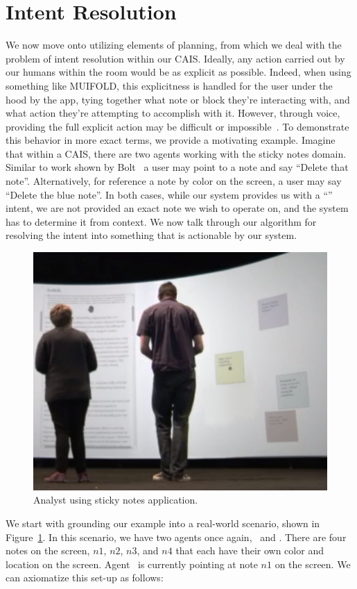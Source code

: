 \section{Intent Resolution}

We now move onto utilizing elements of planning, from which we deal with
the problem of intent resolution within our CAIS.
Ideally, any action carried out by our humans within the room would be as explicit
as possible. Indeed, when using something like MUIFOLD, this explicitness is handled for
the user under the hood by the app, tying together what note or block they're interacting
with, and what action they're attempting to accomplish with it. However, through voice,
providing the full explicit action may be difficult or
impossible~\cite{kephart_embodied_2019}. To demonstrate this
behavior in more exact terms, we provide a motivating example. Imagine that within a CAIS, there
are two agents working with the sticky notes domain. Similar to work shown by
Bolt~\cite{bolt_put-that-there:_1980} a user may point to a note and say ``Delete that
note''. Alternatively, for reference a note by color on the screen, a user may say ``Delete the blue
note''. In both cases, while our system provides us with a ``\delete'' intent, we are not
provided an exact note we wish to operate on, and the system has to determine it from
context. We now talk through our algorithm for resolving the intent into something that
is actionable by our system.

\begin{figure}
\centering
  \includegraphics[width=0.7\columnwidth]{chapters/06_planning/figures/intent_sticky_notes.png}
  \caption{Analyst using sticky notes application.}
  \label{fig:intent_sticky_notes}
\end{figure}

We start with grounding our example into a real-world scenario, shown in
Figure~\ref{fig:intent_sticky_notes}. In this scenario, we have two agents once again, \humana\ and
\humanb. There are four notes on the screen, $n1$, $n2$, $n3$, and $n4$ that each have their own color
and location on the screen. Agent \humanb\ is currently pointing at note $n1$ on the screen. We can
axiomatize this set-up as follows:

